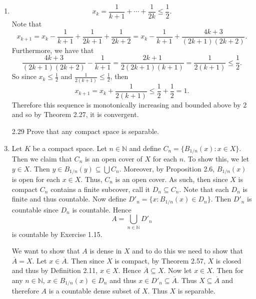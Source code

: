 \documentclass[12pt]{article}
\makeatletter
\theoremstyle{definition}
\theoremstyle{remark}
\renewenvironment{proof}[1][\proofname]{\par
  \pushQED{\qed}%
  \normalfont \topsep6\p@\@plus6\p@\relax
  \list{}{\leftmargin=0mm
          \rightmargin=4mm
          \settowidth{\itemindent}{\itshape#1}%
          \labelwidth=\itemindent
          \parsep=0pt \listparindent=\parindent 
  }
  \item[\hskip\labelsep
        \itshape
    #1\@addpunct{.}]\ignorespaces
}{%
  \popQED\endlist\@endpefalse
}
\let\oldproofname=\proofname
\renewcommand{\proofname}{\bf{\textit{\oldproofname}}}
\makeatother
\begin{document}
\begin{enumerate}[leftmargin=*]
\begin{proof}
                        \begin{equation*}
                            x_k=\frac{1}{k+1}+\cdots +\frac{1}{2k}\leq\frac{1}{2}.
                        \end{equation*}
                    Note that 
                        \begin{equation*}
                            x_{k+1}=x_k-\frac{1}{k+1}+\frac{1}{2k+1}+\frac{1}{2k+2}=x_k-\frac{1}{k+1}+\frac{4k+3}{(2k+1)(2k+2)}.
                        \end{equation*}
                    Furthermore, we have that 
                        \begin{equation*}
                            \frac{4k+3}{(2k+1)(2k+2)}-\frac{1}{k+1}=\frac{2k+1}{2(2k+1)(k+1)}=\frac{1}{2(k+1)}\leq\frac{1}{2}.
                        \end{equation*}
                    So since $x_k\leq \frac{1}{2}$ and $\frac{1}{2(k+1)}\leq\frac{1}{2}$, then 
                        \begin{equation*}
                            x_{k+1}=x_k+\frac{1}{2(k+1)}\leq \frac{1}{2}+\frac{1}{2}=1. 
                        \end{equation*}
                    Therefore this sequence is monotonically increasing and bounded above by 2 and so by Theorem 2.27, it is convergent. 
                \end{proof}
            \item[2.29] Prove that any compact space is separable.
                \begin{proof}
                    Let $K$ be a compact space. Let $n\in\mathbb{N}$ and define $C_n=\{B_{1/n}(x)\colon x\in X\}$. Then we claim that $C_n$ is an open cover of $X$ for each $n$. To show this, we let $y\in X$. Then $y\in B_{1/n}(y)\subseteq\bigcup C_n$. Moreover, by Proposition 2.6, $B_{1/n}(x)$ is open for each $x\in X$. Thus, $C_n$ is an open cover. As such, then since $X$ is compact $C_n$ contains a finite subcover, call it $D_n\subseteq C_n$. Note that each $D_n$ is finite and thus countable. Now define $D'_n=\{x\colon B_{1/n}(x)\in D_n\}$. Then $D'_n$ is countable since $D_n$ is countable. Hence
                        \begin{equation*}
                            A=\bigcup_{n\in\mathbb{N}} D'_n
                        \end{equation*}
                    is countable by Exercise 1.15.\par\hspace{4mm} We want to show that $A$ is dense in $X$ and to do this we need to show that $\overline{A}=X$. Let $x\in\overline{A}$. Then since $X$ is compact, by Theorem 2.57, $X$ is closed and thus by Definition 2.11, $x\in X$. Hence $\overline{A}\subseteq X$. Now let $x\in X$. Then for any $n\in\mathbb{N}$, $x\in B_{1/n}(x)\in D_n$ and thus $x\in D'_n\subseteq \overline{A}$. Thus $X\subseteq \overline{A}$ and therefore $A$ is a countable dense subset of $X$. Thus $X$ is separable.

\end{proof}
\end{enumerate}
\end{document}
